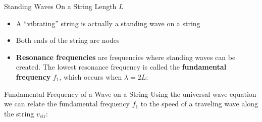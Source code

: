 \documentclass[12pt,aspectratio=169]{beamer}
\newcommand{\eq}[2]{\vspace{#1}{\Large\begin{displaymath}#2\end{displaymath}}}
\begin{document}
\begin{frame}{Standing Waves On a String Length $L$}
  \begin{itemize}
  \item A ``vibrating'' string is actually a standing wave on a string
  \item Both ends of the string are nodes
  \item\textbf{Resonance frequencies} are frequencies where standing waves can
    be created. The lowest resonance frequency is called the
    \textbf{fundamental frequency} $f_1$, which occurs when $\lambda=2L$:
    \begin{center}
    \end{center}
  \end{itemize}
\end{frame}


\begin{frame}{Fundamental Frequency of a Wave on a String}
  Using the universal wave equation we can relate the fundamental frequency
  $f_1$ to the speed of a traveling wave along the string $v_\mathrm{str}$:

  \eq{-.2in}{
    \boxed{f_1=\frac{v_\mathrm{str}}{\lambda}=\frac{v_\mathrm{str}}{2L}}
  }
\end{frame}
\end{document}
